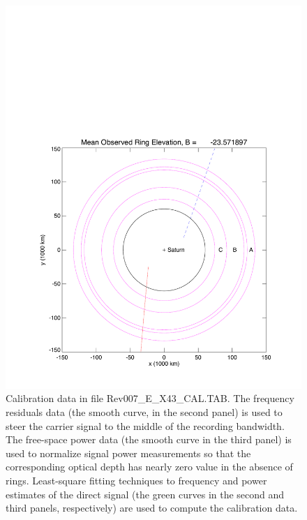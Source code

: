 \documentclass[crop=false,class=book]{standalone}
\begin{document}
\begin{figure}[H]
    \centering
    \includegraphics[page=4,trim = {0.67in 0.5in 0.45in 0.5in},clip,width=\textwidth]{Rev007_E_X43_summary_p1_08FEB2018.pdf}
    \caption[Calibration Data from Cal File]{Calibration data in file Rev007\_E\_X43\_CAL.TAB. The frequency residuals data (the smooth curve, in the second panel) is used to steer the carrier signal to the middle of the recording bandwidth. The free-space power data (the smooth curve in the third panel) is used to normalize signal power measurements so that the corresponding optical depth has nearly zero value in the absence of rings. Least-square fitting techniques to frequency and power estimates of the direct signal (the green curves in the second and third panels, respectively) are used to compute the calibration data.}
\end{figure}
\end{document}
